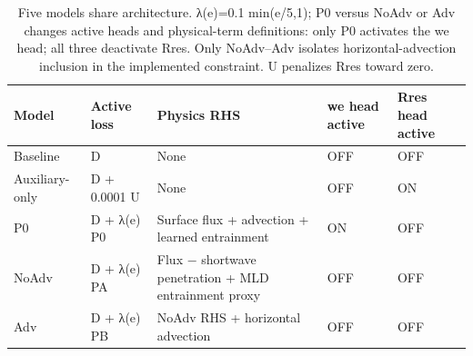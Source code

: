 \begin{table}
\caption{Five models share architecture. λ(e)=0.1 min(e/5,1); P0 versus NoAdv or Adv changes active heads and physical-term definitions: only P0 activates the we head; all three deactivate Rres. Only NoAdv–Adv isolates horizontal-advection inclusion in the implemented constraint. U penalizes Rres toward zero.}
\label{tab:table2_models}
\begin{tabular}{lllll}
\toprule
Model & Active loss & Physics RHS & we head active & Rres head active \\
\midrule
Baseline & D & None & OFF & OFF \\
Auxiliary-only & D + 0.0001 U & None & OFF & ON \\
P0 & D + λ(e) P0 & Surface flux + advection + learned entrainment & ON & OFF \\
NoAdv & D + λ(e) PA & Flux − shortwave penetration + MLD entrainment proxy & OFF & OFF \\
Adv & D + λ(e) PB & NoAdv RHS + horizontal advection & OFF & OFF \\
\bottomrule
\end{tabular}
\end{table}
